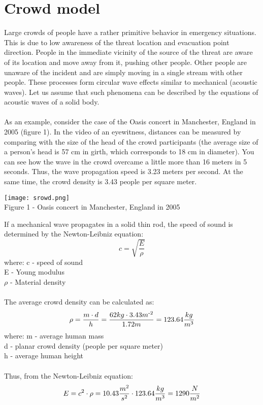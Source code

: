 \documentclass[12pt,a4paper]{report}
\begin{document}
\chapter*{Crowd model}
Large crowds of people have a rather primitive behavior in emergency situations. This is due to low awareness of the threat location and evacuation point direction. People in the immediate vicinity of the source of the threat are aware of its location and move away from it, pushing other people. Other people are unaware of the incident and are simply moving in a single stream with other people. These processes form circular wave effects similar to mechanical (acoustic waves). Let us assume that such phenomena can be described by the equations of acoustic waves of a solid body.\\\\
As an example, consider the case of the Oasis concert in Manchester, England in 2005 (figure 1).  In the video of an eyewitness, distances can be measured by comparing with the size of the head of the crowd participants (the average size of a person's head is 57 cm in girth, which corresponds to 18 cm in diameter). You can see how the wave in the crowd overcame a little more than 16 meters in 5 seconds. Thus, the wave propagation speed is 3.23 meters per second. At the same time, the crowd density is 3.43 people per square meter.\\
\begin{center}
    \texttt{[image: srowd.png]}\\
    Figure 1 - Oasis concert in Manchester, England in 2005
\end{center}
If a mechanical wave propagates in a solid thin rod, the speed of sound is determined by the Newton-Leibniz equation:
\[ c = \sqrt{\frac{E}{\rho}}\]
where: c - speed of sound\\
E - Young modulus\\
$\rho$ - Material density\\\\
The average crowd density can be calculated as:
\[ \rho=\frac{m \cdot d }{h}=\frac{62kg \cdot 3.43 m \textsuperscript{-2}}{1.72 m}=123.64\frac{kg}{m \textsuperscript{3}}\]
where: m - average human mass\\
d - planar crowd density (people per square meter)\\
h - average human height\\\\
Thus, from the Newton-Leibniz equation:
\[ E = c\textsuperscript{2} \cdot \rho = 10.43\frac{m\textsuperscript{2}}{s\textsuperscript{2}} \cdot 123.64\frac{kg}{m \textsuperscript{3}} = 1290 \frac{N}{m\textsuperscript{2}}\]\\
\end{document}
